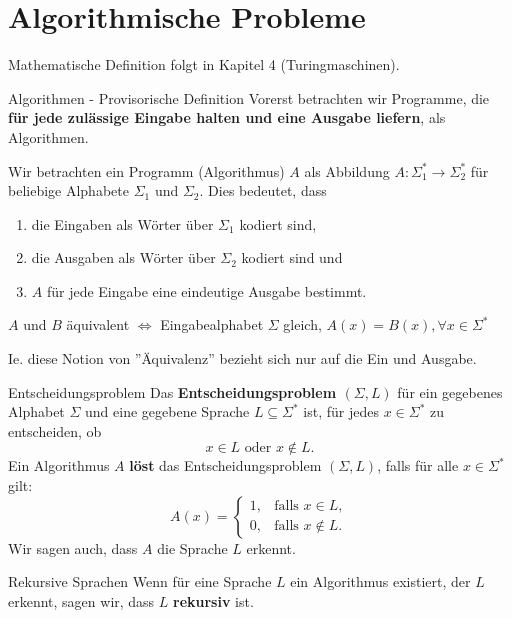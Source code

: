 \documentclass[a4paper, 11pt]{article}
\begin{document}
\section{Algorithmische Probleme}

	Mathematische Definition folgt in Kapitel 4 (Turingmaschinen).
	\begin{mainbox}{Algorithmen - Provisorische Definition}
		Vorerst betrachten wir Programme, die \textbf{für jede zulässige Eingabe halten und eine Ausgabe liefern}, als Algorithmen.

		Wir betrachten ein Programm (Algorithmus) $A$ als Abbildung $A: \Sigma_1^* \to \Sigma_2^*$ für beliebige Alphabete $\Sigma_1$ und $\Sigma_2$. Dies bedeutet, dass 
		\begin{enumerate}[label=(\roman*)]
			\item die Eingaben als Wörter über $\Sigma_1$ kodiert sind,
			\item die Ausgaben als Wörter über $\Sigma_2$ kodiert sind und
			\item $A$ für jede Eingabe eine eindeutige Ausgabe bestimmt.
		\end{enumerate}
	\end{mainbox}

	$A$ und $B$ äquivalent $\iff$ Eingabealphabet $\Sigma$ gleich, $A(x) = B(x), \forall x \in \Sigma^*$
	
	Ie. diese Notion von ''Äquivalenz'' bezieht sich nur auf die Ein und Ausgabe.




	\begin{mainbox}{Entscheidungsproblem}
		Das \textbf{Entscheidungsproblem $(\Sigma, L)$} für ein gegebenes Alphabet $\Sigma$ und eine gegebene Sprache $L \subseteq \Sigma^*$ ist, für jedes $x \in \Sigma^*$ zu entscheiden, ob 
		$$x \in L \text{ oder } x \notin L.$$
		Ein Algorithmus $A$ \textbf{löst} das Entscheidungsproblem $(\Sigma, L)$, falls für alle $x \in \Sigma^*$ gilt:
		$$A(x) = \begin{cases}
			1, &\text{falls }x \in L,\\
			0, &\text{falls }x \notin L.
		\end{cases}$$
		Wir sagen auch, dass $A$ die Sprache $L$ erkennt.
	\end{mainbox}






	\begin{subbox}{Rekursive Sprachen}
		Wenn für eine Sprache $L$ ein Algorithmus existiert, der $L$ erkennt, sagen wir, dass $L$ \textbf{rekursiv} ist.
	\end{subbox}
\end{document}
